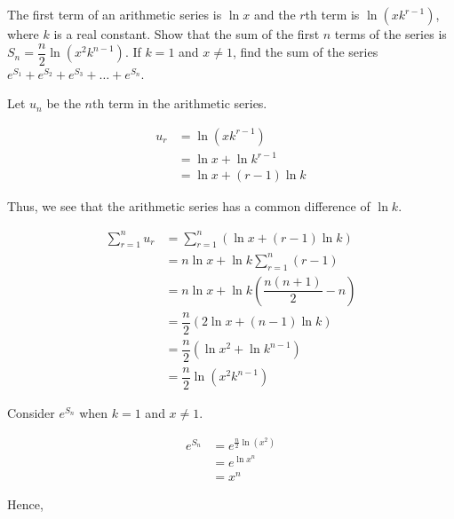 \documentclass{echw}
\begin{document}
    \problem{}
        The first term of an arithmetic series is $\ln x$ and the $r$th term is $\ln (xk^{r-1})$, where $k$ is a real constant. Show that the sum of the first $n$ terms of the series is $S_n = \dfrac{n}2 \ln (x^2k^{n-1})$. If $k = 1$ and $x \neq 1$, find the sum of the series $e^{S_1} + e^{S_2} + e^{S_3} + \ldots + e^{S_n}$.

    \solution
        Let $u_n$ be the $n$th term in the arithmetic series.

        \begin{equation*}
            \begin{aligned}
                u_r &= \ln (xk^{r-1})\\
                &= \ln x + \ln k^{r-1}\\
                &= \ln x + (r-1)\ln k
            \end{aligned}
        \end{equation*}

        Thus, we see that the arithmetic series has a common difference of $\ln k$.
        
        \begin{equation*}
            \begin{aligned}
                \sum_{r=1}^n u_r &= \sum_{r=1}^n (\ln x + (r-1)\ln k) \\
                &= n\ln x + \ln k \sum_{r=1}^n (r-1)\\
                &= n\ln x + \ln k \left(\dfrac{n(n+1)}2 - n \right)\\
                &= \dfrac{n}2 (2\ln x  +(n-1)\ln k)\\
                &= \dfrac{n}2 (\ln x^2 + \ln k^{n-1})\\
                &= \dfrac{n}2 \ln (x^2k^{n-1})
            \end{aligned}
        \end{equation*}

        Consider $e^{S_n}$ when $k = 1$ and $x \neq 1$.

        \begin{equation*}
            \begin{aligned}
                e^{S_n} &= e^{\tfrac{n}2 \ln (x^2)}\\
                &= e^{\ln{x^n}}\\
                &= x^n
            \end{aligned}
        \end{equation*}

        Hence,
\end{document}
